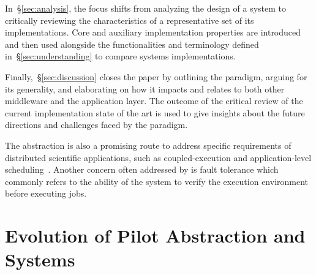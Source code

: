 \documentclass{sig-alternate}
\begin{document}
In~\S\ref{sec:analysis}, the focus shifts from analyzing the design of a
\pilotjob system to critically reviewing the characteristics of a representative
set of its implementations. Core and auxiliary implementation properties are
introduced and then used alongside the functionalities and terminology defined
in~\S\ref{sec:understanding} to compare \pilotjob systems implementations.

Finally,~\S\ref{sec:discussion} closes the paper by outlining the \pilot
paradigm, arguing for its generality, and elaborating on how it impacts and
relates to both other middleware and the application layer. The outcome of the
critical review of the current implementation state of the art is used to give
insights about the future directions and challenges faced by the \pilot
paradigm.

 The \pilotjob abstraction is also a
promising route to address specific requirements of distributed scientific
applications, such as coupled-execution and application-level
scheduling~\cite{ko2010efficient,kim2010exploring}. Another concern often
addressed by \pilotjobs is fault tolerance which commonly refers to the ability
of the \pilotjob system to verify the execution environment before executing
jobs.

 


%
\section{Evolution of Pilot Abstraction and Systems}
\label{sec:history}


\end{document}
